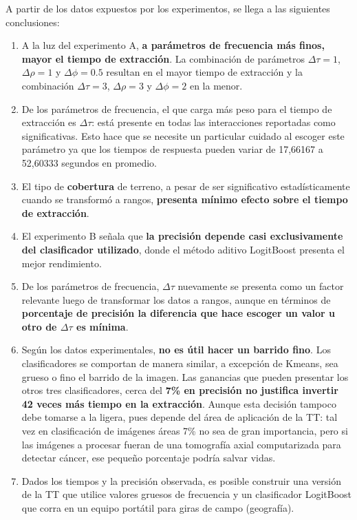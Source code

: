 A partir de los datos expuestos por los experimentos, se llega a las siguientes conclusiones:
\begin{enumerate}

\item A la luz del experimento A, \textbf{a parámetros de frecuencia más finos, mayor el tiempo de extracción}. La combinación de parámetros $\Delta \tau=1$, $\Delta \rho=1$ y $\Delta \phi=0.5$ resultan en el mayor tiempo de extracción y la combinación $\Delta \tau=3$, $\Delta \rho=3$ y $\Delta \phi=2$ en la menor.

\item De los parámetros de frecuencia, el que carga más peso para el tiempo de extracción es \textbf{$\Delta \tau$}: está presente en todas las interacciones reportadas como significativas. Esto hace que se necesite un particular cuidado al escoger este parámetro ya que los tiempos de respuesta pueden variar de 17,66167 a 52,60333 segundos en promedio.

\item El tipo de \textbf{cobertura} de terreno, a pesar de ser significativo estadísticamente cuando se transformó a rangos, \textbf{presenta mínimo efecto sobre el tiempo de extracción}.

\item El experimento B señala que \textbf{la precisión depende casi exclusivamente del clasificador utilizado}, donde el método aditivo LogitBoost presenta el mejor rendimiento.

\item De los parámetros de frecuencia, $\Delta \tau$ nuevamente se presenta como un factor relevante luego de transformar los datos a rangos, aunque en términos de \textbf{porcentaje de precisión la diferencia que hace escoger un valor u otro de $\Delta \tau$ es mínima}.

\item Según los datos experimentales, \textbf{no es útil hacer un barrido fino}. Los clasificadores se comportan de manera similar, a excepción de Kmeans, sea grueso o fino el barrido de la imagen. Las ganancias que pueden presentar los otros tres clasificadores, cerca del \textbf{7\% en precisión no justifica invertir 42 veces más tiempo en la extracción}. Aunque esta decisión tampoco debe tomarse a la ligera, pues depende del área de aplicación de la TT: tal vez en clasificación de imágenes áreas 7\% no sea de gran importancia, pero si las imágenes a procesar fueran de una tomografía axial computarizada para detectar cáncer, ese pequeño porcentaje podría salvar vidas.

\item Dados los tiempos y la precisión observada, es posible construir una versión de la TT que utilice valores gruesos de frecuencia y un clasificador LogitBoost que corra en un equipo portátil para giras de campo (geografía).

\end{enumerate}


